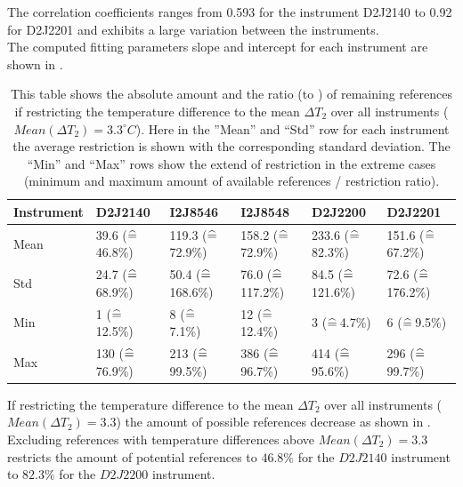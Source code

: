 The correlation coefficients ranges from 0.593 for the instrument D2J2140 to  0.92 for D2J2201 and exhibits a large variation between the instruments. \\
The computed fitting parameters slope and intercept for each instrument are shown in .\\
\begin{table}
	\centering
	\begin{tabular}{|p{1.8cm}|p{2.15cm}|p{2.15cm}|p{2.15cm}|p{2.15cm}|p{2.15cm}|}
		Instrument	&D2J2140&I2J8546& I2J8548&D2J2200&D2J2201\\
		\toprule
		Mean&
		39.6 ($\mathrel{\widehat{=}}\,$46.8\%)&
		119.3 ($\mathrel{\widehat{=}}\,$72.9\%)
		&158.2 ($\mathrel{\widehat{=}}\,$72.9\%)
		&233.6 ($\mathrel{\widehat{=}}\,$82.3\%)
		&151.6 ($\mathrel{\widehat{=}}\,$67.2\%)\\
		\midrule
		Std&
		24.7 ($\mathrel{\widehat{=}}\,$68.9\%)&
		50.4 ($\mathrel{\widehat{=}}\,$168.6\%)&
		76.0 ($\mathrel{\widehat{=}}\,$117.2\%)&
		84.5 ($\mathrel{\widehat{=}}\,$121.6\%)&
		72.6 ($\mathrel{\widehat{=}}\,$176.2\%)\\
		\midrule
		Min&
		1 ($\mathrel{\widehat{=}}\,$12.5\%)
		&8 ($\mathrel{\widehat{=}}\,$7.1\%)&
		12 ($\mathrel{\widehat{=}}\,$12.4\%)&
		3 ($\mathrel{\widehat{=}}\,$4.7\%) &
		6 ($\mathrel{\widehat{=}}\,$9.5\%)\\
		\midrule
		Max
		&
		130	 ($\mathrel{\widehat{=}}\,$76.9\%)&
		213	 ($\mathrel{\widehat{=}}\,$99.5\%)&
		386 ($\mathrel{\widehat{=}}\,$96.7\%)&
		414	 ($\mathrel{\widehat{=}}\,$95.6\%) &
		296	 ($\mathrel{\widehat{=}}\,$99.7\%)\\
		\bottomrule
	\end{tabular}
	\caption{This table shows the absolute amount and the ratio (to ) of remaining references if restricting the temperature difference to the mean $\Delta T_{2}$ over all instruments ($Mean(\Delta T_{2}) = 3.3^{\circ}C$). Here in the ”Mean” and “Std” row for each  instrument the average restriction is shown with the corresponding standard deviation. The “Min” and “Max” rows show the extend of restriction in the extreme cases (minimum and maximum amount of available references / restriction ratio).}
	\label{tab:decTemp}
\end{table}	
If restricting the temperature difference to the mean $\Delta T_{2}$ over all instruments ($Mean(\Delta T_{2}) = 3.3$) the amount of possible references decrease as shown in . Excluding references with temperature differences above $Mean(\Delta T_{2}) = 3.3$ restricts the amount of potential references to $46.8\%$ for the $D2J2140$ instrument to $82.3\%$ for the $D2J2200$ instrument.

